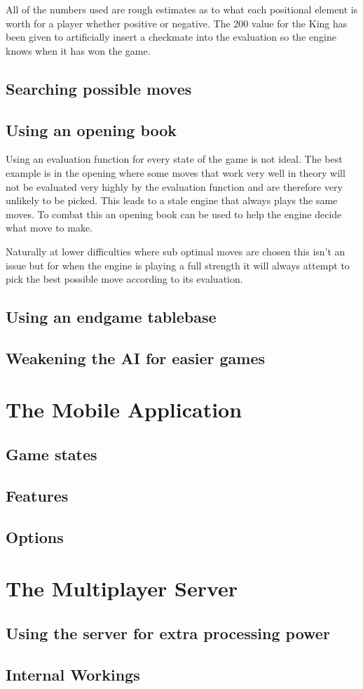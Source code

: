\documentclass[11pt]{report}
\begin{document}
All of the numbers used are rough estimates as to what each positional element is worth for a player whether positive or negative. The 200 value for the King has been given to artificially insert a checkmate into the evaluation so the engine knows when it has won the game. 

\section{Searching possible moves}

\section{Using an opening book}

Using an evaluation function for every state of the game is not ideal. The best example is in the opening where some moves that work very well in theory will not be evaluated very highly by the evaluation function and are therefore very unlikely to be picked. This leads to a stale engine that always plays the same moves. To combat this an opening book can be used to help the engine decide what move to make. \newline

Naturally at lower difficulties where sub optimal moves are chosen this isn't an issue but for when the engine is playing a full strength it will always attempt to pick the best possible move according to its evaluation.

\section{Using an endgame tablebase}

\section{Weakening the AI for easier games}


\chapter{The Mobile Application}

\section{Game states}

\section{Features}

\section{Options}

\chapter{The Multiplayer Server}

\section{Using the server for extra processing power}

\section{Internal Workings}
\end{document}
